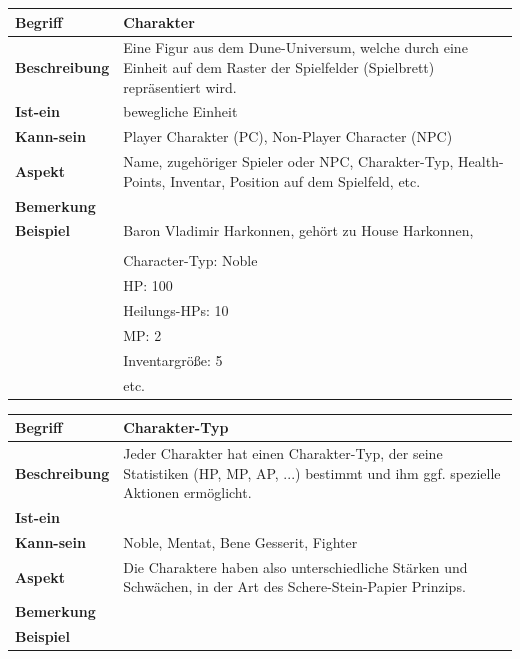 \documentclass[12pt]{article}
\begin{document}
\begin{tabularx}{16cm}{|l|X|}
\hline
\textbf{Begriff} & \textbf{Charakter} \\
\hline
\textbf{Beschreibung} & Eine Figur aus dem Dune-Universum, welche durch eine Einheit auf dem Raster der Spielfelder (Spielbrett) repräsentiert wird. \\
\hline
\textbf{Ist-ein} & bewegliche Einheit \\
\hline
\textbf{Kann-sein} & Player Charakter (PC), Non-Player Character (NPC) \\
\hline
\textbf{Aspekt} & Name, zugehöriger Spieler oder NPC, Charakter-Typ, Health-Points, Inventar, Position auf dem Spielfeld, etc. \\
\hline
\textbf{Bemerkung} &  \\
\hline
\textbf{Beispiel} & Baron Vladimir Harkonnen, gehört zu House Harkonnen, \\
\\
& Character-Typ: Noble \\
& HP: 100 \\
& Heilungs-HPs: 10 \\
& MP: 2 \\
& Inventargröße: 5 \\
& etc. \\
\hline
\end{tabularx}

\begin{tabularx}{16cm}{|l|X|}
\hline
\textbf{Begriff} & \textbf{Charakter-Typ} \\
\hline
\textbf{Beschreibung} & Jeder Charakter hat einen Charakter-Typ, der seine Statistiken (HP, MP, AP, ...) bestimmt und ihm ggf. spezielle Aktionen ermöglicht. \\
\hline
\textbf{Ist-ein} & \\
\hline
\textbf{Kann-sein} & Noble, Mentat, Bene Gesserit, Fighter\\
\hline
\textbf{Aspekt} & Die Charaktere haben also unterschiedliche Stärken und Schwächen, in der Art des Schere-Stein-Papier Prinzips.\\
\hline
\textbf{Bemerkung} &  \\
\hline
\textbf{Beispiel} &  \\
\hline
\end{tabularx}
\end{document}
